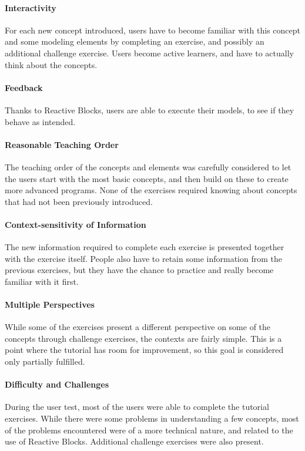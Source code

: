 \paragraph{Interactivity} For each new concept introduced, users have to become familiar with this concept and some modeling elements by completing an exercise, and possibly an additional challenge exercise. Users become active learners, and have to actually think about the concepts.

\paragraph{Feedback} Thanks to Reactive Blocks, users are able to execute their models, to see if they behave as intended.

\paragraph{Reasonable Teaching Order} The teaching order of the concepts and elements was carefully considered to let the users start with the most basic concepts, and then build on these to create more advanced programs. None of the exercises required knowing about concepts that had not been previously introduced.

\paragraph{Context-sensitivity of Information} The new information required to complete each exercise is presented together with the exercise itself. People also have to retain some information from the previous exercises, but they have the chance to practice and really become familiar with it first.

\paragraph{Multiple Perspectives} While some of the exercises present a different perspective on some of the concepts through challenge exercises, the contexts are fairly simple. This is a point where the tutorial has room for improvement, so this goal is considered only partially fulfilled.

\paragraph{Difficulty and Challenges} During the user test, most of the users were able to complete the tutorial exercises. While there were some problems in understanding a few concepts, most of the problems encountered were of a more technical nature, and related to the use of Reactive Blocks. Additional challenge exercises were also present.

